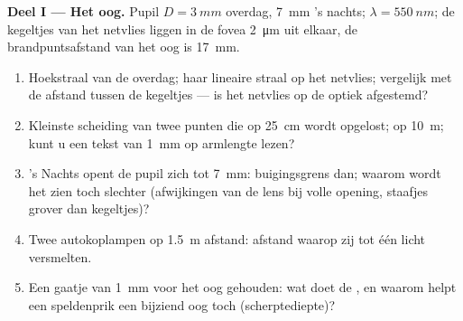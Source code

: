 \begin{problem}
\label{pb:b2:diffraction:1}

\medskip
\noindent\textbf{Deel I --- Het oog.}
Pupil $D = \qty{3}{mm}$ overdag, \qty{7}{mm} 's nachts;
$\lambda = \qty{550}{nm}$; de
kegeltjes van het netvlies liggen in de fovea \qty{2}{\micro m} uit elkaar,
de brandpuntsafstand
van het oog is \qty{17}{mm}.
\begin{enumerate}
  \item Hoekstraal van de  overdag; haar lineaire straal op
        het netvlies; vergelijk met de afstand tussen de kegeltjes --- is
        het netvlies
        op de optiek afgestemd?
  \item Kleinste scheiding van twee punten die op \qty{25}{cm} wordt opgelost; op
        \qty{10}{m}; kunt u een tekst van \qty{1}{mm} op armlengte lezen?
  \item 's Nachts opent de pupil zich tot \qty{7}{mm}: buigingsgrens dan;
        waarom wordt het zien toch slechter (afwijkingen van de
        lens bij volle opening, staafjes grover dan kegeltjes)?
  \item Twee autokoplampen op \qty{1.5}{m} afstand: afstand waarop zij tot
        één licht versmelten.
  \item Een gaatje van \qty{1}{mm} voor het oog gehouden: wat doet de ,
        en waarom helpt een speldenprik een bijziend oog toch
        (scherptediepte)?
\end{enumerate}


\end{problem}
